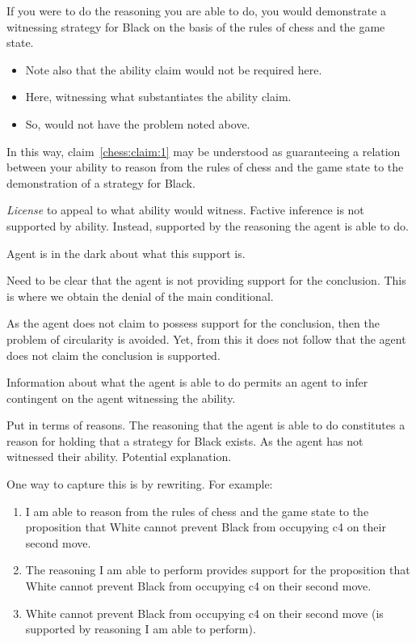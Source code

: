 \documentclass[10pt]{article}
\begin{document}
If you were to do the reasoning you are able to do, you would demonstrate a witnessing strategy for Black on the basis of the rules of chess and the game state.

\begin{itemize}
\item Note also that the ability claim would not be required here.
\item Here, witnessing what substantiates the ability claim.
\item So, would not have the problem noted above.
\end{itemize}

In this way, claim~\ref{chess:claim:1} may be understood as guaranteeing a relation between your ability to reason from the rules of chess and the game state to the demonstration of a strategy for Black.

\emph{License} to appeal to what ability would witness.
Factive inference is not supported by ability.
Instead, supported by the reasoning the agent is able to do.

Agent is in the dark about what this support is.

Need to be clear that the agent is not providing support for the conclusion.
This is where we obtain the denial of the main conditional.

As the agent does not claim to possess support for the conclusion, then the problem of circularity is avoided.
Yet, from this it does not follow that the agent does not claim the conclusion is supported.

Information about what the agent is able to do permits an agent to infer contingent on the agent witnessing the ability.

Put in terms of reasons.
The reasoning that the agent is able to do constitutes a reason for holding that a strategy for Black exists.
As the agent has not witnessed their ability.
Potential explanation.

One way to capture this is by rewriting.
For example:

\begin{enumerate}
\item\label{potential:claim} I am able to reason from the rules of chess and the game state to the proposition that White cannot prevent Black from occupying c4 on their second move.
\item\label{potential:necessity} The reasoning I am able to perform provides support for the proposition that White cannot prevent Black from occupying c4 on their second move.
\item\label{potential:focus} White cannot prevent Black from occupying c4 on their second move (is supported by reasoning I am able to perform).
\end{enumerate}
\end{document}
